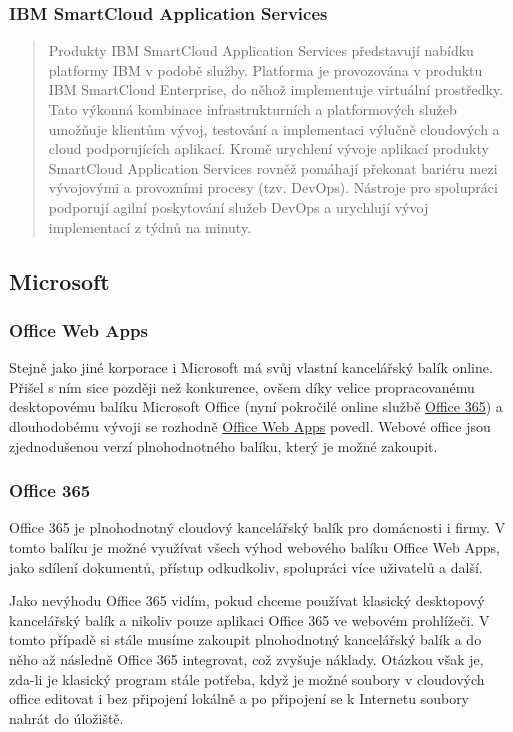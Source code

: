 \subsubsection{IBM SmartCloud Application Services}
\begin{quote}
Produkty IBM SmartCloud Application Services představují nabídku platformy IBM v podobě služby. Platforma je provozována v produktu IBM SmartCloud Enterprise, do něhož implementuje virtuální prostředky. Tato výkonná kombinace infrastrukturních a platformových služeb umožňuje klientům vývoj, testování a implementaci výlučně cloudových a cloud podporujících aplikací. Kromě urychlení vývoje aplikací produkty SmartCloud Application Services rovněž pomáhají překonat bariéru mezi vývojovými a provozními procesy (tzv. DevOps). Nástroje pro spolupráci podporují agilní poskytování služeb DevOps a urychlují vývoj implementací z týdnů na minuty.\cite{ibm:smartCloudEnt}
\end{quote}

\subsection{Microsoft}
\subsubsection{Office Web Apps}
Stejně jako jiné korporace i Microsoft má svůj vlastní kancelářský balík online. Přišel s ním sice později než konkurence, ovšem díky velice propracovanému desktopovému balíku Microsoft Office (nyní pokročilé online službě \href{https://office.microsoft.com}{Office 365}) a dlouhodobému vývoji se rozhodně \href{https://skydrive.live.com}{Office Web Apps} povedl. Webové office jsou zjednodušenou verzí plnohodnotného balíku, který je možné zakoupit.

\subsubsection{Office 365}
Office 365 je plnohodnotný cloudový kancelářský balík pro domácnosti i firmy. V tomto balíku je možné využívat všech výhod webového balíku Office Web Apps, jako sdílení dokumentů, přístup odkudkoliv, spolupráci více uživatelů a další. 

Jako nevýhodu Office 365 vidím, pokud chceme používat klasický desktopový kancelářský balík a nikoliv pouze aplikaci Office 365 ve webovém prohlížeči. V tomto případě si stále musíme zakoupit plnohodnotný kancelářský balík a do něho až následně Office 365 integrovat, což zvyšuje náklady. Otázkou však je, zda-li je klasický program stále potřeba, když je možné soubory v cloudových office editovat i bez připojení lokálně a po připojení se k Internetu soubory nahrát do úložiště.

